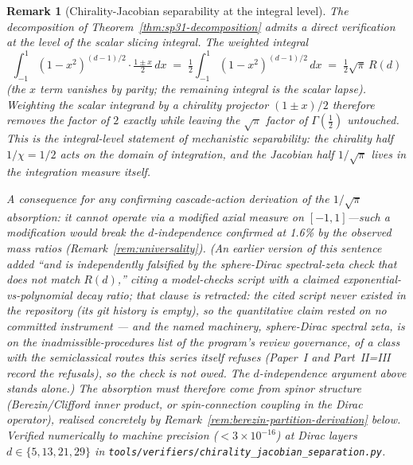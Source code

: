 \documentclass[12pt,a4paper]{article}
\newtheorem*{remark}{Remark}
\begin{document}
\begin{remark}[Chirality-Jacobian separability at the integral level]\label{rem:chirality-jacobian-separability}
The decomposition of Theorem~\ref{thm:sp31-decomposition} admits a
direct verification at the level of the scalar slicing integral. The
weighted integral
\[
\int_{-1}^{1}(1-x^2)^{(d-1)/2}\cdot\tfrac{1\pm x}{2}\,dx
\;=\;
\tfrac{1}{2}\int_{-1}^{1}(1-x^2)^{(d-1)/2}\,dx
\;=\;
\tfrac{1}{2}\sqrt{\pi}\,R(d)
\]
(the $x$ term vanishes by parity; the remaining integral is the scalar
lapse). Weighting the scalar integrand by a chirality projector
$(1\pm x)/2$ therefore removes the factor of $2$ exactly while leaving
the $\sqrt{\pi}$ factor of $\Gamma(\tfrac{1}{2})$ untouched. This is
the integral-level statement of mechanistic separability: the chirality
half $1/\chi = 1/2$ acts on the domain of integration, and the Jacobian
half $1/\sqrt{\pi}$ lives in the integration measure itself.

A consequence for any confirming cascade-action derivation of the
$1/\sqrt{\pi}$ absorption: it cannot operate via a
modified axial measure on $[-1,1]$---such a modification would break
the $d$-independence confirmed at 1.6\% by the observed mass ratios
(Remark~\ref{rem:universality}). (An earlier version of this sentence
added ``and is independently falsified by the sphere-Dirac
spectral-zeta check that does not match $R(d)$,'' citing a
model-checks script with a claimed exponential-vs-polynomial decay
ratio; that clause is retracted: the cited script never existed in
the repository (its git history is empty), so the quantitative claim
rested on no committed instrument --- and the named machinery,
sphere-Dirac spectral zeta, is on the inadmissible-procedures list of
the program's review governance, of a class with the semiclassical
routes this series itself refuses (Paper~I and Part~II=III record the
refusals), so the check is not owed. The $d$-independence argument above
stands alone.) The absorption must therefore come from
spinor structure (Berezin/Clifford inner product, or spin-connection
coupling in the Dirac operator), realised concretely by
Remark~\ref{rem:berezin-partition-derivation} below. Verified numerically
to machine precision ($<3\times 10^{-16}$) at Dirac layers
$d\in\{5,13,21,29\}$ in
\texttt{tools/verifiers/chirality\_jacobian\_separation.py}.
\end{remark}
\end{document}
